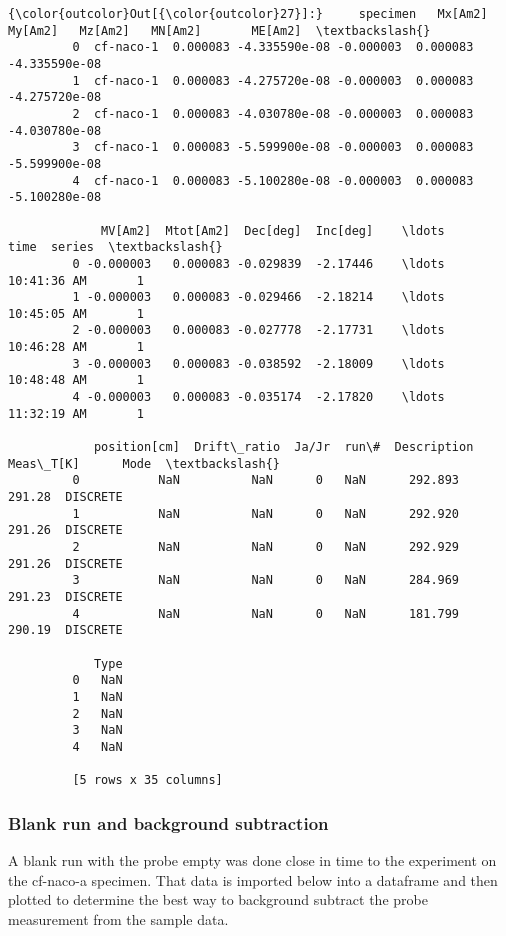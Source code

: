 \documentclass{article}
\begin{document}
            \begin{Verbatim}[commandchars=\\\{\}]
{\color{outcolor}Out[{\color{outcolor}27}]:}     specimen   Mx[Am2]       My[Am2]   Mz[Am2]   MN[Am2]       ME[Am2]  \textbackslash{}
         0  cf-naco-1  0.000083 -4.335590e-08 -0.000003  0.000083 -4.335590e-08   
         1  cf-naco-1  0.000083 -4.275720e-08 -0.000003  0.000083 -4.275720e-08   
         2  cf-naco-1  0.000083 -4.030780e-08 -0.000003  0.000083 -4.030780e-08   
         3  cf-naco-1  0.000083 -5.599900e-08 -0.000003  0.000083 -5.599900e-08   
         4  cf-naco-1  0.000083 -5.100280e-08 -0.000003  0.000083 -5.100280e-08   
         
             MV[Am2]  Mtot[Am2]  Dec[deg]  Inc[deg]    \ldots            time  series  \textbackslash{}
         0 -0.000003   0.000083 -0.029839  -2.17446    \ldots     10:41:36 AM       1   
         1 -0.000003   0.000083 -0.029466  -2.18214    \ldots     10:45:05 AM       1   
         2 -0.000003   0.000083 -0.027778  -2.17731    \ldots     10:46:28 AM       1   
         3 -0.000003   0.000083 -0.038592  -2.18009    \ldots     10:48:48 AM       1   
         4 -0.000003   0.000083 -0.035174  -2.17820    \ldots     11:32:19 AM       1   
         
            position[cm]  Drift\_ratio  Ja/Jr  run\#  Description  Meas\_T[K]      Mode  \textbackslash{}
         0           NaN          NaN      0   NaN      292.893     291.28  DISCRETE   
         1           NaN          NaN      0   NaN      292.920     291.26  DISCRETE   
         2           NaN          NaN      0   NaN      292.929     291.26  DISCRETE   
         3           NaN          NaN      0   NaN      284.969     291.23  DISCRETE   
         4           NaN          NaN      0   NaN      181.799     290.19  DISCRETE   
         
            Type  
         0   NaN  
         1   NaN  
         2   NaN  
         3   NaN  
         4   NaN  
         
         [5 rows x 35 columns]
\end{Verbatim}
        

    \subsubsection{Blank run and background subtraction}


    A blank run with the probe empty was done close in time to the
experiment on the cf-naco-a specimen. That data is imported below into a
dataframe and then plotted to determine the best way to background
subtract the probe measurement from the sample data.
\end{document}
